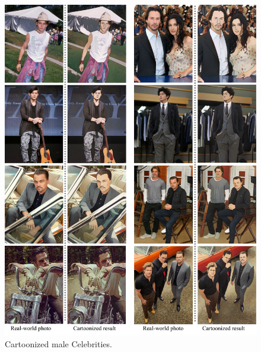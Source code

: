 \documentclass[10pt,twocolumn,letterpaper]{article}
\begin{document}
\newpage
{\small  }

\begin{figure}[b]
\vspace{-0.5em}
\centering
\includegraphics[width=\linewidth]{figures/person1.pdf}
\caption{Cartoonized male Celebrities.}
\label{fig:person1}
\vspace{-0.5em}
\end{figure}
\end{document}
